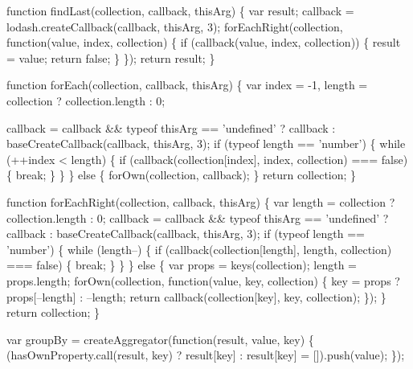 \begin{DoxyCodeInclude}
    \textcolor{keyword}{function} findLast(collection, callback, thisArg) \{
      var result;
      callback = lodash.createCallback(callback, thisArg, 3);
      forEachRight(collection, \textcolor{keyword}{function}(value, index, collection) \{
        \textcolor{keywordflow}{if} (callback(value, index, collection)) \{
          result = value;
          \textcolor{keywordflow}{return} \textcolor{keyword}{false};
        \}
      \});
      \textcolor{keywordflow}{return} result;
    \}

    \textcolor{keyword}{function} forEach(collection, callback, thisArg) \{
      var index = -1,
          length = collection ? collection.length : 0;

      callback = callback && typeof thisArg == \textcolor{stringliteral}{'undefined'} ? callback : baseCreateCallback(callback, 
      thisArg, 3);
      \textcolor{keywordflow}{if} (typeof length == \textcolor{stringliteral}{'number'}) \{
        \textcolor{keywordflow}{while} (++index < length) \{
          \textcolor{keywordflow}{if} (callback(collection[index], index, collection) === \textcolor{keyword}{false}) \{
            \textcolor{keywordflow}{break};
          \}
        \}
      \} \textcolor{keywordflow}{else} \{
        forOwn(collection, callback);
      \}
      \textcolor{keywordflow}{return} collection;
    \}

    \textcolor{keyword}{function} forEachRight(collection, callback, thisArg) \{
      var length = collection ? collection.length : 0;
      callback = callback && typeof thisArg == \textcolor{stringliteral}{'undefined'} ? callback : baseCreateCallback(callback, 
      thisArg, 3);
      \textcolor{keywordflow}{if} (typeof length == \textcolor{stringliteral}{'number'}) \{
        \textcolor{keywordflow}{while} (length--) \{
          \textcolor{keywordflow}{if} (callback(collection[length], length, collection) === \textcolor{keyword}{false}) \{
            \textcolor{keywordflow}{break};
          \}
        \}
      \} \textcolor{keywordflow}{else} \{
        var props = keys(collection);
        length = props.length;
        forOwn(collection, \textcolor{keyword}{function}(value, key, collection) \{
          key = props ? props[--length] : --length;
          \textcolor{keywordflow}{return} callback(collection[key], key, collection);
        \});
      \}
      \textcolor{keywordflow}{return} collection;
    \}

    var groupBy = createAggregator(\textcolor{keyword}{function}(result, value, key) \{
      (hasOwnProperty.call(result, key) ? result[key] : result[key] = []).push(value);
    \});


\end{DoxyCodeInclude}
